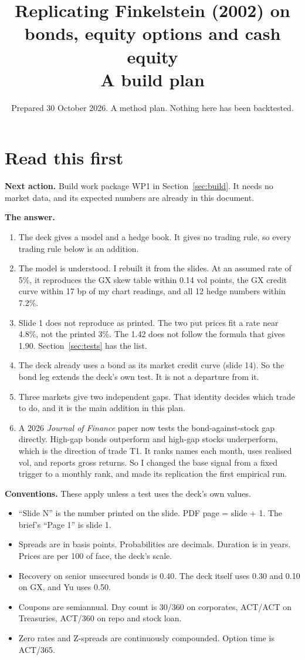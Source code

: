 \documentclass[10pt,a4paper]{article}
\title{\vspace{-1.0cm}Replicating Finkelstein (2002) on bonds, equity options and cash equity\\[2pt]\large A build plan}
\author{}
\date{Prepared 30 October 2026. A method plan. Nothing here has been backtested.}
\begin{document}
\maketitle
\vspace{-0.6cm}

\section*{Read this first}

\textbf{Next action.} Build work package WP1 in Section~\ref{sec:build}. It needs no market data, and its expected numbers are already in this document.

\textbf{The answer.}
\begin{enumerate}[nosep]
\item The deck gives a model and a hedge book. It gives no trading rule, so every trading rule below is an addition.
\item The model is understood. I rebuilt it from the slides. At an assumed rate of 5\%, it reproduces the GX skew table within 0.14 vol points, the GX credit curve within 17 bp of my chart readings, and all 12 hedge numbers within 7.2\%.
\item Slide 1 does not reproduce as printed. The two put prices fit a rate near 4.8\%, not the printed 3\%. The 1.42 does not follow the formula that gives 1.90. Section~\ref{sec:tests} has the list.
\item The deck already uses a bond as its market credit curve (slide 14). So the bond leg extends the deck's own test. It is not a departure from it.
\item Three markets give two independent gaps. That identity decides which trade to do, and it is the main addition in this plan.
\item A 2026 \emph{Journal of Finance} paper now tests the bond-against-stock gap directly. High-gap bonds outperform and high-gap stocks underperform, which is the direction of trade T1. It ranks names each month, uses realised vol, and reports gross returns. So I changed the base signal from a fixed trigger to a monthly rank, and made its replication the first empirical run.
\end{enumerate}

\textbf{Conventions.} These apply unless a test uses the deck's own values.
\begin{itemize}[nosep]
\item ``Slide N'' is the number printed on the slide. PDF page = slide + 1. The brief's ``Page 1'' is slide 1.
\item Spreads are in basis points. Probabilities are decimals. Duration is in years. Prices are per 100 of face, the deck's scale.
\item Recovery on senior unsecured bonds is 0.40. The deck itself uses 0.30 and 0.10 on GX, and Yu uses 0.50.
\item Coupons are semiannual. Day count is 30/360 on corporates, ACT/ACT on Treasuries, ACT/360 on repo and stock loan.
\item Zero rates and Z-spreads are continuously compounded. Option time is ACT/365.
\end{itemize}
\end{document}
